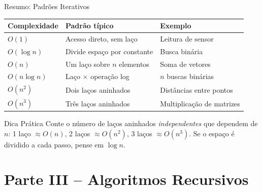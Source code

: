 \documentclass[aspectratio=169]{beamer}
\begin{document}
\begin{frame}[shrink]{Resumo: Padrões Iterativos}
    \begin{center}
    \renewcommand{\arraystretch}{1.3}
    \begin{tabular}{lll}
        \toprule
        \textbf{Complexidade} & \textbf{Padrão típico} & \textbf{Exemplo} \\
        \midrule
        $O(1)$           & Acesso direto, sem laço           & Leitura de sensor \\
        $O(\log n)$      & Divide espaço por constante       & Busca binária \\
        $O(n)$           & Um laço sobre $n$ elementos       & Soma de vetores \\
        $O(n \log n)$    & Laço $\times$ operação log        & $n$ buscas binárias \\
        $O(n^2)$         & Dois laços aninhados              & Distâncias entre pontos \\
        $O(n^3)$         & Três laços aninhados              & Multiplicação de matrizes \\
        \bottomrule
    \end{tabular}
    \end{center}
    
    \vspace{0.3cm}
    \begin{alertblock}{Dica Prática}
        Conte o número de laços aninhados \emph{independentes} que dependem de $n$: 1 laço $\approx O(n)$, 2 laços $\approx O(n^2)$, 3 laços $\approx O(n^3)$. Se o espaço é dividido a cada passo, pense em $\log n$.
    \end{alertblock}
\end{frame}

\section{Parte III -- Algoritmos Recursivos}
\end{document}
